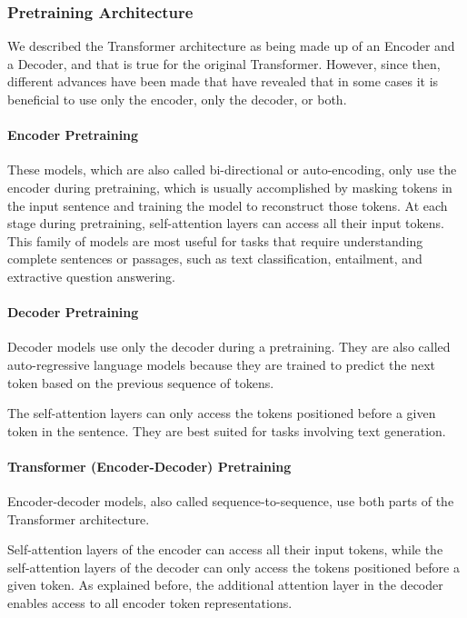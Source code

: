 \documentclass{article}
\begin{document}
\subsubsection{Pretraining Architecture}

We described the Transformer architecture as being made up of an Encoder and a Decoder, and that is true for the original Transformer. However, since then, different advances have been made that have revealed that in some cases it is beneficial to use only the encoder, only the decoder, or both.

\paragraph{Encoder Pretraining}

These models, which are also called bi-directional or auto-encoding, only use the encoder during pretraining, which is usually accomplished by masking tokens in the input sentence and training the model to 
reconstruct those tokens. 
At each stage during pretraining, self-attention layers can access all their input tokens. This family of models are most useful for tasks that require understanding 
complete sentences or passages, such as text classification, entailment, and extractive question answering.

\paragraph{Decoder Pretraining}


Decoder models use only the decoder during a pretraining. They are also called auto-regressive language models because they are trained to predict the next token based on the previous sequence of tokens. 

The self-attention layers can only access the tokens positioned before a given token in the sentence. They are best suited for tasks involving text generation.

\paragraph{Transformer (Encoder-Decoder) Pretraining}

Encoder-decoder models, also called sequence-to-sequence, use both parts of the Transformer architecture. 

Self-attention layers of the encoder can access all their input tokens, while the self-attention layers of the decoder can only access the tokens positioned before a given token. As explained before, the additional attention layer in the decoder enables access to all encoder token representations. 
\end{document}
